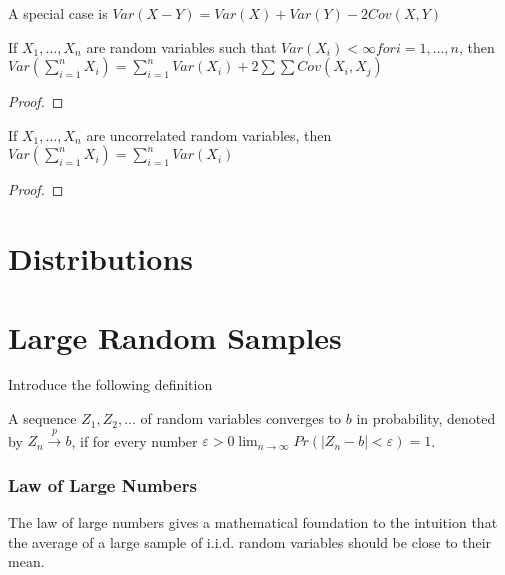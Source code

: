 A special case is $Var\left(X-Y\right)=Var\left(X\right)+Var\left(Y\right)-2Cov\left(X,Y\right)$

\begin{proposition}
If $X_{1},\ldots,X_{n}$ are random variables such that $Var\left(X_{i}\right)<\infty for i=1,\ldots,n$, then $Var\left(\sum_{i=1}^{n}X_{i}\right)=\sum_{i=1}^{n}Var\left(X_{i}\right)+2\sum\sum Cov\left(X_{i},X_{j}\right)$
\end{proposition}
\begin{proof}
\end{proof}

\begin{proposition}
If $X_{1},\ldots,X_{n}$ are uncorrelated random variables, then $Var\left(\sum_{i=1}^{n}X_{i}\right)=\sum_{i=1}^{n}Var\left(X_{i}\right)$
\end{proposition}
\begin{proof}
\end{proof}


%
%

\section{Distributions}
\label{sec:probability_distributions}


%
%

\section{Large Random Samples}
\label{sec:probability_random_samples}

{\color{red} Introduce the following definition}

\begin{definition}
A sequence $Z_1, Z_2, \ldots$ of random variables converges to $b$ in probability, denoted by $Z_n \overset{p}{\rightarrow} b$, if for every number $\varepsilon>0 \lim_{n\rightarrow\infty}Pr\left(\left|Z_{n}-b\right|<\varepsilon\right)=1$.
\end{definition}


\subsubsection*{Law of Large Numbers}

{\color{red} The law of large numbers gives a mathematical foundation to the intuition that the average of a large sample of i.i.d. random variables should be close to their mean.}

